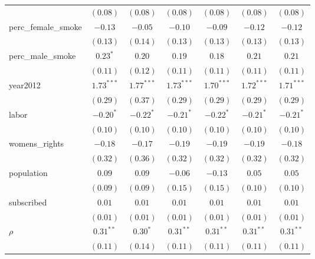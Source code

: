 \begin{table}[!h]
\begin{center}
\begin{tabular}{l c c c c c c }
                        & $(0.08)$     & $(0.08)$     & $(0.08)$     & $(0.08)$     & $(0.08)$     & $(0.08)$     \\
perc\_female\_smoke     & $-0.13$      & $-0.05$      & $-0.10$      & $-0.09$      & $-0.12$      & $-0.12$      \\
                        & $(0.13)$     & $(0.14)$     & $(0.13)$     & $(0.13)$     & $(0.13)$     & $(0.13)$     \\
perc\_male\_smoke       & $0.23^{*}$   & $0.20$       & $0.19$       & $0.18$       & $0.21$       & $0.21$       \\
                        & $(0.11)$     & $(0.12)$     & $(0.11)$     & $(0.11)$     & $(0.11)$     & $(0.11)$     \\
year2012                & $1.73^{***}$ & $1.77^{***}$ & $1.73^{***}$ & $1.70^{***}$ & $1.72^{***}$ & $1.71^{***}$ \\
                        & $(0.29)$     & $(0.37)$     & $(0.29)$     & $(0.29)$     & $(0.29)$     & $(0.29)$     \\
labor                   & $-0.20^{*}$  & $-0.22^{*}$  & $-0.21^{*}$  & $-0.22^{*}$  & $-0.21^{*}$  & $-0.21^{*}$  \\
                        & $(0.10)$     & $(0.10)$     & $(0.10)$     & $(0.10)$     & $(0.10)$     & $(0.10)$     \\
womens\_rights          & $-0.18$      & $-0.17$      & $-0.19$      & $-0.19$      & $-0.19$      & $-0.18$      \\
                        & $(0.32)$     & $(0.36)$     & $(0.32)$     & $(0.32)$     & $(0.32)$     & $(0.32)$     \\
population              & $0.09$       & $0.09$       & $-0.06$      & $-0.13$      & $0.05$       & $0.05$       \\
                        & $(0.09)$     & $(0.09)$     & $(0.15)$     & $(0.15)$     & $(0.10)$     & $(0.10)$     \\
subscribed              & $0.01$       & $0.01$       & $0.01$       & $0.01$       & $0.01$       & $0.01$       \\
                        & $(0.01)$     & $(0.01)$     & $(0.01)$     & $(0.01)$     & $(0.01)$     & $(0.01)$     \\
$\rho$                  & $0.31^{**}$  & $0.30^{*}$   & $0.31^{**}$  & $0.31^{**}$  & $0.31^{**}$  & $0.31^{**}$  \\
                        & $(0.11)$     & $(0.14)$     & $(0.11)$     & $(0.11)$     & $(0.11)$     & $(0.11)$     \\

\end{tabular}
\end{center}
\end{table}

